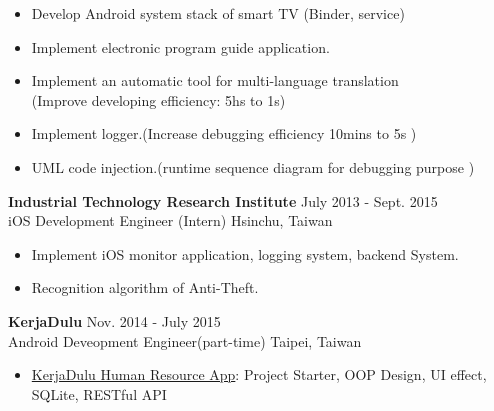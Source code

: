 \documentclass{res}
\begin{document}
\begin{resume}
				\begin{itemize}[leftmargin=*]
					\item Develop Android system stack of smart TV (Binder, service)	
					\vspace{-0.05in}
					\item Implement electronic program guide application.
					\vspace{-0.05in}
					\item Implement an automatic tool for multi-language translation \\(Improve developing efficiency: 5hs to 1s)
					\vspace{-0.05in}		
					\item Implement logger.(Increase debugging efficiency 10mins to 5s )
					\vspace{-0.05in}	
					\item UML code injection.(runtime sequence diagram for debugging purpose )
				\end{itemize}
				\vspace{-0.1in}
				{\bf Industrial Technology Research Institute } {\hfill July 2013 - Sept. 2015}\\	
				iOS Development Engineer (Intern)                        {\hfill Hsinchu, Taiwan}

				\begin{itemize}[leftmargin=*]
					\item Implement iOS monitor application, logging system, backend System.
					\vspace{-0.05in} 
					\item Recognition algorithm of Anti-Theft.
					\vspace{-0.05in}
				\end{itemize}
				\vspace{-0.1in}

	 			{\bf KerjaDulu }                                {\hfill  Nov. 2014 - July 2015}\\
				Android Deveopment Engineer(part-time)			    	 {\hfill Taipei, Taiwan}
		
				\begin{itemize}[leftmargin=*]
					\item {\href{https://play.google.com/store/apps/details?id=com.kerjadulu.kerjadulu&hl=zh_TW}{KerjaDulu Human Resource App}}: Project Starter, OOP Design, UI effect, SQLite, RESTful API
				\end{itemize}
				\vspace{-0.1in}


\end{resume}
\end{document}
